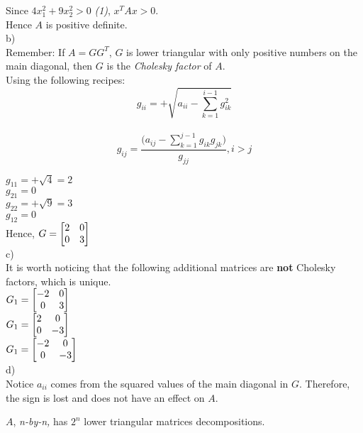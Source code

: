 \documentclass[11pt]{article}
\begin{document}
Since $4x_1^2 + 9x_2^2 > 0$ \textit{(1)}, $x^TAx > 0$.\\
Hence $A$ is positive definite.\\

b)\\
Remember: If $A = GG^T$, $G$ is lower triangular with only positive numbers on the main diagonal, then $G$ is the \textit{Cholesky factor} of $A$.\\

Using the following recipes:
$$g_{ii} = + \sqrt{a_{ii} - \sum_{k=1}^{i-1}g^2_{ik}}$$\\
$$g_{ij} = \dfrac{(a_{ij} - \displaystyle{\sum_{k=1}^{j-1}g_{ik}g_{jk})}}{g_{jj}}, i > j$$

$g_{11} = + \sqrt{4} = 2$\\
$g_{21} = 0$\\
$g_{22} = + \sqrt{9} = 3$\\
$g_{12} = 0$\\
Hence, $G = 
\begin{bmatrix}
	2	&	0\\
	0	&	3
\end{bmatrix}\\
$\\

c)\\
 It is worth noticing that the following additional matrices are \textbf{not} Cholesky factors, which is unique.\\

$G_1 = 
 \begin{bmatrix}
	-2	&	0\\
	0	&	3
\end{bmatrix}\\
$\\
$G_1 = 
 \begin{bmatrix}
	2	&	0\\
	0	&	-3
\end{bmatrix}\\
$\\
$G_1 = 
 \begin{bmatrix}
	-2	&	0\\
	0	&	-3
\end{bmatrix}\\
$\\

d)\\
Notice $a_{ii}$ comes from the squared values of the main diagonal in $G$. Therefore, the sign is lost and does not have an effect on $A$.

$A$, \textit{n-by-n,} has $2^n$ lower triangular matrices decompositions.
\end{document}
